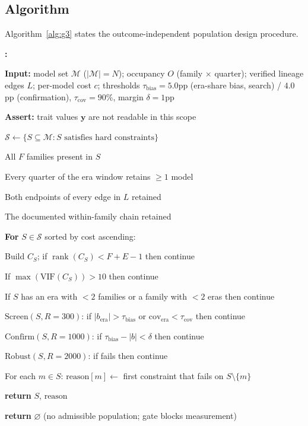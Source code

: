 \documentclass{ieeeaccess}
\theoremstyle{definition}
\theoremstyle{plain}
\newcounter{algstep}
\newenvironment{algsteps}{%
  \footnotesize
  \setcounter{algstep}{0}%
  \begin{list}{\textbf{\thealgstep:}}{%
    \usecounter{algstep}%
    \setlength{\labelwidth}{14pt}%
    \setlength{\labelsep}{4pt}%
    \setlength{\leftmargin}{20pt}%
    \setlength{\rightmargin}{0pt}%
    \setlength{\itemsep}{1pt}%
    \setlength{\parsep}{0pt}%
    \setlength{\topsep}{3pt}%
  }%
}{\end{list}}
\newcommand{\algind}[1]{\hspace*{#1.1em}}
\newcommand{\algkw}[1]{\textbf{#1}}
\begin{document}
\subsection{Algorithm}
Algorithm~\ref{alg:g3} states the outcome-independent population design procedure.

\begin{algorithm}[t]
\caption{Outcome-independent study-population design}
\label{alg:g3}
\begin{algsteps}
\item \algkw{Input:} model set $\mathcal{M}$ ($|\mathcal{M}| = N$); occupancy $O$ (family $\times$ quarter); verified lineage edges $L$; per-model cost $c$; thresholds $\tau_{\text{bias}} = 5.0$pp (era-share bias, search) / $4.0$pp (confirmation), $\tau_{\text{cov}} = 90\%$, margin $\delta = 1$pp
\item \algkw{Assert:} trait values $\mathbf{y}$ are not readable in this scope
\item $\mathcal{S} \leftarrow \{S \subseteq \mathcal{M} : S \text{ satisfies hard constraints}\}$
\item \algind{1} All $F$ families present in $S$
\item \algind{1} Every quarter of the era window retains $\geq 1$ model
\item \algind{1} Both endpoints of every edge in $L$ retained
\item \algind{1} The documented within-family chain retained
\item \algkw{For} $S \in \mathcal{S}$ sorted by cost ascending:
\item \algind{1} Build $C_S$; if $\operatorname{rank}(C_S) < F + E - 1$ then continue
\item \algind{1} If $\max(\text{VIF}(C_S)) > 10$ then continue
\item \algind{1} If $S$ has an era with $< 2$ families or a family with $< 2$ eras then continue
\item \algind{1} $\text{Screen}(S, R=300)$: if $|b_{\text{era}}| > \tau_{\text{bias}}$ or $\text{cov}_{\text{era}} < \tau_{\text{cov}}$ then continue
\item \algind{1} $\text{Confirm}(S, R=1000)$: if $\tau_{\text{bias}} - |b| < \delta$ then continue
\item \algind{1} $\text{Robust}(S, R=2000)$: if fails then continue
\item \algind{1} For each $m \in S$: $\text{reason}[m] \leftarrow$ first constraint that fails on $S \setminus \{m\}$
\item \algkw{return} $S$, $\text{reason}$
\item \algkw{return} $\varnothing$ (no admissible population; gate blocks measurement)
\end{algsteps}
\end{algorithm}
\end{document}
